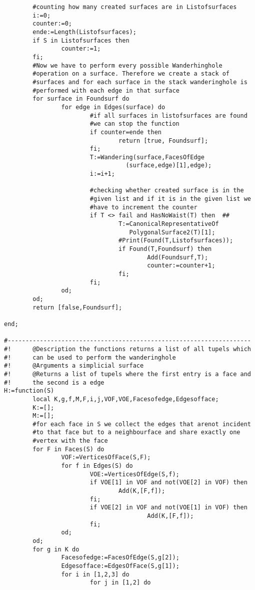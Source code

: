 \documentclass[12pt,titlepage,twoside,cleardoublepage]{article}
\theoremstyle{nummermitklammern}
\numberwithin{equation}{section}
\begin{document}
\begin{linenumbers}
\begin{verbatim}
        #counting how many created surfaces are in Listofsurfaces
        i:=0;
        counter:=0;
        ende:=Length(Listofsurfaces);
        if S in Listofsurfaces then
                counter:=1;
        fi;
        #Now we have to perform every possible Wanderhinghole 
        #operation on a surface. Therefore we create a stack of 
        #surfaces and for each surface in the stack wanderinghole is 
        #performed with each edge in that surface
        for surface in Foundsurf do
                for edge in Edges(surface) do
                        #if all surfaces in listofsurfaces are found 
                        #we can stop the function
                        if counter=ende then
                                return [true, Foundsurf];
                        fi;
                        T:=Wandering(surface,FacesOfEdge
                                  (surface,edge)[1],edge);
                        i:=i+1;

                        #checking whether created surface is in the
                        #given list and if it is in the given list we 
                        #have to increment the counter
                        if T <> fail and HasNoWaist(T) then  ##
                                T:=CanonicalRepresentativeOf
                                   PolygonalSurface2(T)[1];
                                #Print(Found(T,Listofsurfaces));
                                if Found(T,Foundsurf) then
                                        Add(Foundsurf,T);
                                        counter:=counter+1;
                                fi;
                        fi;
                od;
        od;
        return [false,Foundsurf];

end;

#--------------------------------------------------------------------
#!      @Description the functions returns a list of all tupels which 
#!      can be used to perform the wanderinghole
#!      @Arguments a simplicial surface
#!      @Returns a list of tupels where the first entry is a face and 
#!      the second is a edge
H:=function(S)
        local K,g,f,M,F,i,j,VOF,VOE,Facesofedge,Edgesofface;
        K:=[];
        M:=[];
        #for each face in S we collect the edges that arenot incident 
        #to that face but to a neighbourface and share exactly one 
        #vertex with the face
        for F in Faces(S) do
                VOF:=VerticesOfFace(S,F);
                for f in Edges(S) do
                        VOE:=VerticesOfEdge(S,f);
                        if VOE[1] in VOF and not(VOE[2] in VOF) then
                                Add(K,[F,f]);
                        fi;
                        if VOE[2] in VOF and not(VOE[1] in VOF) then
                                        Add(K,[F,f]);
                        fi;
                od;
        od;
        for g in K do
                Facesofedge:=FacesOfEdge(S,g[2]);
                Edgesofface:=EdgesOfFace(S,g[1]);
                for i in [1,2,3] do
                        for j in [1,2] do


\end{verbatim}
\end{linenumbers}
\end{document}
